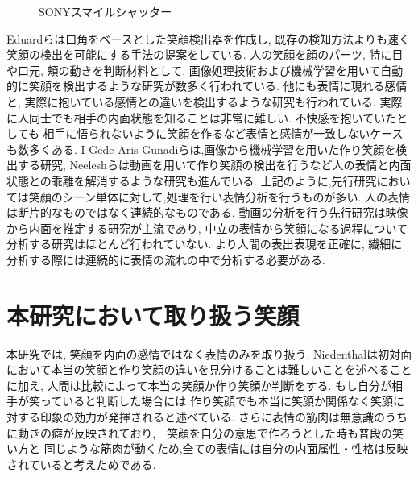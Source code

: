 \begin{figure}[htbp]
    \begin{center}
    \end{center}
    \caption{SONYスマイルシャッター}
    \label{fig:sony_smile_shutter}
\end{figure}

Eduardらは口角をベースとした笑顔検出器を作成し,
既存の検知方法よりも速く笑顔の検出を可能にする手法の提案をしている\cite{EduardRoyce}.
人の笑顔を顔のパーツ, 特に目や口元, 頬の動きを判断材料として, 画像処理技術および機械学習を用いて自動的に笑顔を検出するような研究が数多く行われている.
他にも表情に現れる感情と, 実際に抱いている感情との違いを検出するような研究も行われている.
実際に人同士でも相手の内面状態を知ることは非常に難しい. 不快感を抱いていたとしても 相手に悟られないように笑顔を作るなど表情と感情が一致しないケースも数多くある.
I Gede Aris Gunadiらは,画像から機械学習を用いた作り笑顔を検出する研究\cite{IGedeArisGunadi}, Neeleshらは動画を用いて作り笑顔の検出\cite{NeeleshBhakt}を行うなど人の表情と内面状態との乖離を解消するような研究も進んでいる.
上記のように,先行研究においては笑顔のシーン単体に対して,処理を行い表情分析を行うものが多い.
人の表情は断片的なものではなく連続的なものである.
動画の分析を行う先行研究は映像から内面を推定する研究が主流であり,
中立の表情から笑顔になる過程について分析する研究はほとんど行われていない.
より人間の表出表現を正確に, 繊細に分析する際には連続的に表情の流れの中で分析する必要がある.


\section{本研究において取り扱う笑顔}
本研究では, 笑顔を内面の感情ではなく表情のみを取り扱う. %
Niedenthalは初対面において本当の笑顔と作り笑顔の違いを見分けることは難しいことを述べることに加え,
人間は比較によって本当の笑顔か作り笑顔か判断をする. もし自分が相手が笑っていると判断した場合には
作り笑顔でも本当に笑顔か関係なく笑顔に対する印象の効力が発揮されると述べている\cite{niedenthal2010simulation}.
さらに表情の筋肉は無意識のうちに動きの癖が反映されており,　笑顔を自分の意思で作ろうとした時も普段の笑い方と
同じような筋肉が動くため,全ての表情には自分の内面属性・性格は反映されていると考えためである.

